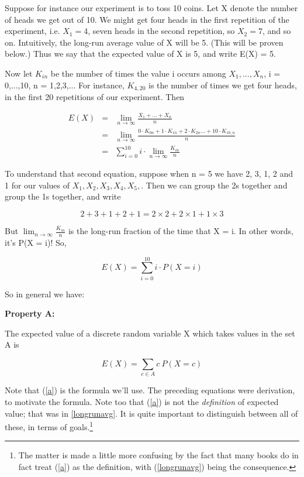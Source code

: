 Suppose for instance our experiment is to toss 10 coins.  Let X denote
the number of heads we get out of 10.  We might get four heads in the
first repetition of the experiment, i.e. $X_1 = 4$, seven heads in the
second repetition, so $X_2 = 7$, and so on.  Intuitively, the long-run
average value of X will be 5.  (This will be proven below.) Thus we say
that the expected value of X is 5, and write E(X) = 5.

Now let $K_{in}$ be the number of times the value i occurs among
$X_1,...,X_n$, i = 0,...,10, n = 1,2,3,...  For instance, $K_{4,20}$ is
the number of times we get four heads, in the first 20 repetitions of
our experiment.  Then

\begin{eqnarray}
E(X) &=& \lim_{n \rightarrow \infty} \frac{X_1+...+X_n}{n} \\
&=& \lim_{n \rightarrow \infty} \frac{0 \cdot K_{0n}+1 \cdot K_{1n}+2 \cdot
K_{2n}...+10 \cdot K_{10,n}}{n} \\
&=& \sum_{i=0}^{10} i \cdot \lim_{n \rightarrow \infty} \frac{K_{in}}{n}
\end{eqnarray}

To understand that second equation, suppose when n = 5 we have
2, 3, 1, 2 and 1 for our values of $X_1,X_2,X_3,X_4,X_5,$.  Then we can
group the 2s together and group the 1s together, and write

\begin{equation}
2 +3 + 1 + 2 + 1 = 2 \times 2 + 2 \times 1 + 1 \times 3
\end{equation}

But $\lim_{n \rightarrow \infty} \frac{K_{in}}{n}$ is the long-run
fraction of the time that X = i.  In other words, it's P(X = i)!
So,

\begin{equation}
E(X) = \sum_{i=0}^{10} i \cdot P(X = i)
\end{equation}

So in general we have: 

{\bf Property A:} 

The expected value of a discrete random variable X which takes values in
the set A is 

\begin{equation}
\label{a}
E(X) = \sum_{c \in A} c ~ P(X = c)
\end{equation}

Note that (\ref{a}) is the formula we'll use.  The preceding equations
were derivation, to motivate the formula.  Note too that (\ref{a}) is not
the {\it definition} of expected value; that was in \ref{longrunavg}.
It is quite important to distinguish between all of these, in terms of
goals.\footnote{The matter is made a little more confusing by the fact
that many books do in fact treat (\ref{a}) as the definition, with
(\ref{longrunavg}) being the consequence.}

